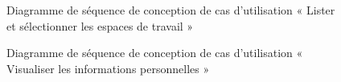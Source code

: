 \begin{figure}[H]
  \centering
  \caption{Diagramme de séquence de conception de cas d'utilisation « Lister et sélectionner les espaces de travail »}
  \label{fig:conception_sequence_lister_selectionner_workspaces}
\end{figure}

\begin{figure}[H]
  \centering
  \caption{Diagramme de séquence de conception de cas d'utilisation «  Visualiser les informations personnelles »}
  \label{fig:conception_sequence_visualiser_profil}
\end{figure}


